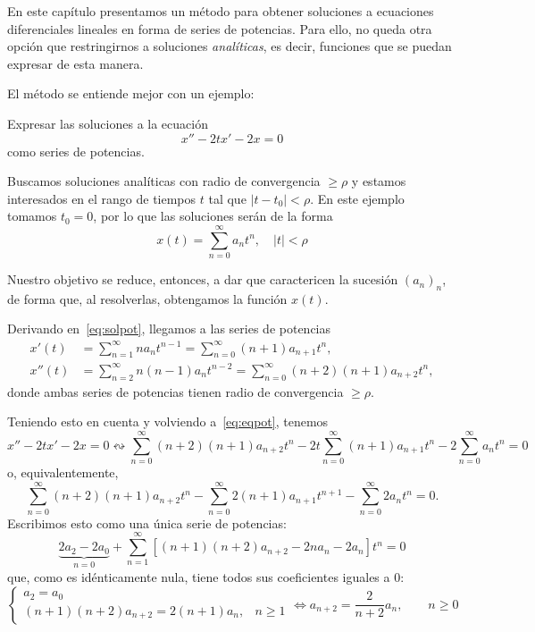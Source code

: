 \documentclass[../ecuaciones_diferenciales.tex]{subfiles}
\begin{document}
En este capítulo presentamos un método para obtener soluciones a ecuaciones
diferenciales lineales en forma de series de potencias. Para ello, no queda otra
opción que restringirnos a soluciones \emph{analíticas}, es decir, funciones que
se puedan expresar de esta manera.

El método se entiende mejor con un ejemplo:

\begin{example}
	Expresar las soluciones a la ecuación
	\begin{equation} \label{eq:eqpot}
		x''-2tx'-2x=0
	\end{equation}
	como series de potencias.

	Buscamos soluciones analíticas con radio de convergencia \(\geq \rho\) y
	estamos interesados en el rango de tiempos \(t\) tal que \(|t-t_0| <
	\rho\). En este ejemplo tomamos \(t_0 = 0\), por lo que las soluciones serán
	de la forma
	\begin{equation}
		\label{eq:solpot}
		x(t) = \sum_{n=0}^\infty a_nt^n, \quad |t| < \rho
	\end{equation}

	Nuestro objetivo se reduce, entonces, a dar  que 
	caractericen la sucesión \((a_n)_n\), de forma que, al resolverlas, 
	obtengamos la función \(x(t)\).

	Derivando en~\eqref{eq:solpot}, llegamos a las series de potencias
	\begin{align*}
		x'(t)  & = \sum_{n=1}^\infty na_nt^{n-1}
		= \sum_{n=0}^\infty (n+1)a_{n+1}t^n,          \\
		x''(t) & = \sum_{n=2}^\infty n(n-1)a_nt^{n-2}
		= \sum_{n=0}^\infty (n+2)(n+1)a_{n+2}t^n,
	\end{align*}
	donde ambas series de potencias tienen radio de convergencia \(\geq \rho\).

	Teniendo esto en cuenta y volviendo a~\eqref{eq:eqpot}, tenemos
	\[x''-2tx'-2x=0 \leftrightsquigarrow \sum_{n=0}^\infty (n+2)(n+1)a_{n+2}t^n -
		2t \sum_{n=0}^\infty (n+1)a_{n+1}t^n - 2 \sum_{n=0}^\infty a_nt^n = 0\]
	o, equivalentemente,
	\[\sum_{n=0}^\infty (n+2)(n+1)a_{n+2}t^n - \sum_{n=0}^\infty
		2(n+1)a_{n+1}t^{n+1} - \sum_{n=0}^\infty 2a_nt^n = 0.\]
	Escribimos esto como una única serie de potencias:
	\[\underbrace{2a_2-2a_0}_{n=0} +
		\sum_{n=1}^\infty[(n+1)(n+2)a_{n+2}-2na_n-2a_n]t^n = 0\]
	que, como es idénticamente nula, tiene todos sus coeficientes iguales a 0:
	\begin{equation}
		\label{eq:seqpot}
		\begin{cases}
			a_2 = a_0                                 \\
			(n+1)(n+2)a_{n+2} = 2(n+1)a_n, & n \geq 1
		\end{cases} \iff
		a_{n+2} = \frac{2}{n+2} a_n, \qquad n \geq 0
	\end{equation}


\end{example}
\end{document}
